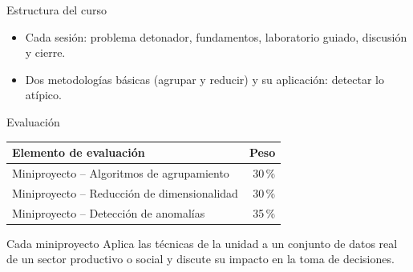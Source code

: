 \documentclass[aspectratio=169,11pt]{beamer}
\begin{document}
\begin{frame}{Estructura del curso}
  \centering
  \vspace{10pt}
  \begin{itemize}
    \item Cada sesión: problema detonador, fundamentos, laboratorio guiado, discusión y cierre.
    \item Dos metodologías básicas (agrupar y reducir) y su aplicación: detectar lo atípico.
  \end{itemize}
\end{frame}

\begin{frame}{Evaluación}
  \centering
  \renewcommand{\arraystretch}{1.3}
  \begin{tabular}{@{}lr@{}}
    \toprule
    \textbf{Elemento de evaluación} & \textbf{Peso}\\
    \midrule
    Miniproyecto -- Algoritmos de agrupamiento & 30\,\% \\
    Miniproyecto -- Reducción de dimensionalidad & 30\,\% \\
    Miniproyecto -- Detección de anomalías & 35\,\% \\
    \bottomrule
  \end{tabular}
  \vspace{8pt}
  \begin{block}{Cada miniproyecto}
    Aplica las técnicas de la unidad a un conjunto de datos real de un sector
    productivo o social y discute su impacto en la toma de decisiones.
  \end{block}
\end{frame}
\end{document}
